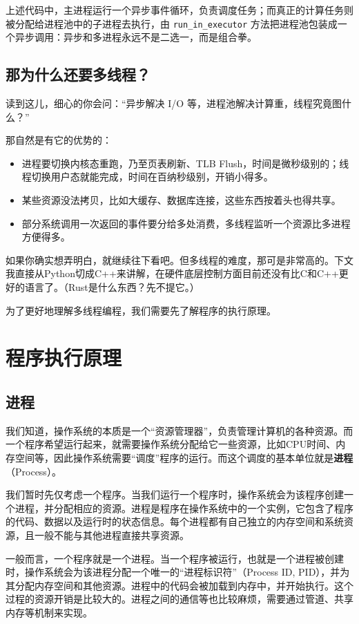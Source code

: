 上述代码中，主进程运行一个异步事件循环，负责调度任务；而真正的计算任务则被分配给进程池中的子进程去执行，由 \texttt{run\_in\_executor} 方法把进程池包装成一个异步调用：异步和多进程永远不是二选一，而是组合拳。

\subsection{那为什么还要多线程？}

读到这儿，细心的你会问：“异步解决 I/O 等，进程池解决计算重，线程究竟图什么？”

那自然是有它的优势的：
\begin{itemize}
    \item 进程要切换内核态重跑，乃至页表刷新、TLB Flush，时间是微秒级别的；线程切换用户态就能完成，时间在百纳秒级别，开销小得多。
    \item 某些资源没法拷贝，比如大缓存、数据库连接，这些东西按着头也得共享。
    \item 部分系统调用一次返回的事件要分给多处消费，多线程监听一个资源比多进程方便得多。
\end{itemize}

如果你确实想弄明白，就继续往下看吧。但多线程的难度，那可是非常高的。下文我直接从Python切成C++来讲解，在硬件底层控制方面目前还没有比C和C++更好的语言了。（Rust是什么东西？先不提它。）

为了更好地理解多线程编程，我们需要先了解程序的执行原理。

\section{程序执行原理}

\subsection{进程}

我们知道，操作系统的本质是一个“资源管理器”，负责管理计算机的各种资源。而一个程序希望运行起来，就需要操作系统分配给它一些资源，比如CPU时间、内存空间等，因此操作系统需要“调度”程序的运行。而这个调度的基本单位就是\textbf{进程}（Process）。

我们暂时先仅考虑一个程序。当我们运行一个程序时，操作系统会为该程序创建一个进程，并分配相应的资源。进程是程序在操作系统中的一个实例，它包含了程序的代码、数据以及运行时的状态信息。每个进程都有自己独立的内存空间和系统资源，且一般不能与其他进程直接共享资源。

一般而言，一个程序就是一个进程。当一个程序被运行，也就是一个进程被创建时，操作系统会为该进程分配一个唯一的“进程标识符”（Process ID, PID），并为其分配内存空间和其他资源。进程中的代码会被加载到内存中，并开始执行。这个过程的资源开销是比较大的。进程之间的通信等也比较麻烦，需要通过管道、共享内存等机制来实现。

